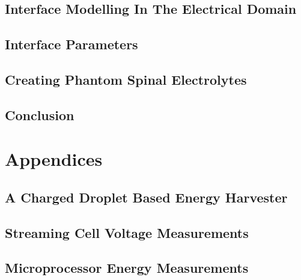 
  \chapter{Interface Modelling In The Electrical Domain}
    \label{chap:theInterfaceModel}
    


  \chapter{Interface Parameters}
    \label{chap:interfaceParameters}
    

  \chapter{Creating Phantom Spinal Electrolytes}
    \label{chap:fluid_mimicry}
    

  \chapter{Conclusion}

 \part{Appendices}

   \appendix

   \chapter{A Charged Droplet Based Energy Harvester}
     \label{appendix:chargedDropletts}
     

   \chapter{Streaming Cell Voltage Measurements}
     \label{appendix:streamingCellMeasurements}
     

   \chapter{Microprocessor Energy Measurements}
     

